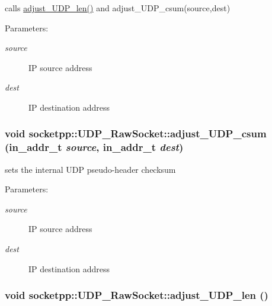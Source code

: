 calls \hyperlink{classsocketpp_1_1UDP__RawSocket_1caa413cfe4f72d8c0aeccdcb10469b5}{adjust\_\-UDP\_\-len()} and adjust\_\-UDP\_\-csum(source,dest) 

\begin{Desc}
\item[Parameters:]
\begin{description}
\item[{\em source}]IP source address \item[{\em dest}]IP destination address \end{description}
\end{Desc}
\hypertarget{classsocketpp_1_1UDP__RawSocket_8d96a58ee9d39e2c014aa81ded23727a}{
\subsubsection[{adjust\_\-UDP\_\-csum}]{\setlength{\rightskip}{0pt plus 5cm}void socketpp::UDP\_\-RawSocket::adjust\_\-UDP\_\-csum (in\_\-addr\_\-t {\em source}, \/  in\_\-addr\_\-t {\em dest})}}
\label{classsocketpp_1_1UDP__RawSocket_8d96a58ee9d39e2c014aa81ded23727a}


sets the internal UDP pseudo-header checksum 

\begin{Desc}
\item[Parameters:]
\begin{description}
\item[{\em source}]IP source address \item[{\em dest}]IP destination address \end{description}
\end{Desc}
\hypertarget{classsocketpp_1_1UDP__RawSocket_1caa413cfe4f72d8c0aeccdcb10469b5}{
\subsubsection[{adjust\_\-UDP\_\-len}]{\setlength{\rightskip}{0pt plus 5cm}void socketpp::UDP\_\-RawSocket::adjust\_\-UDP\_\-len ()}}
\label{classsocketpp_1_1UDP__RawSocket_1caa413cfe4f72d8c0aeccdcb10469b5}


